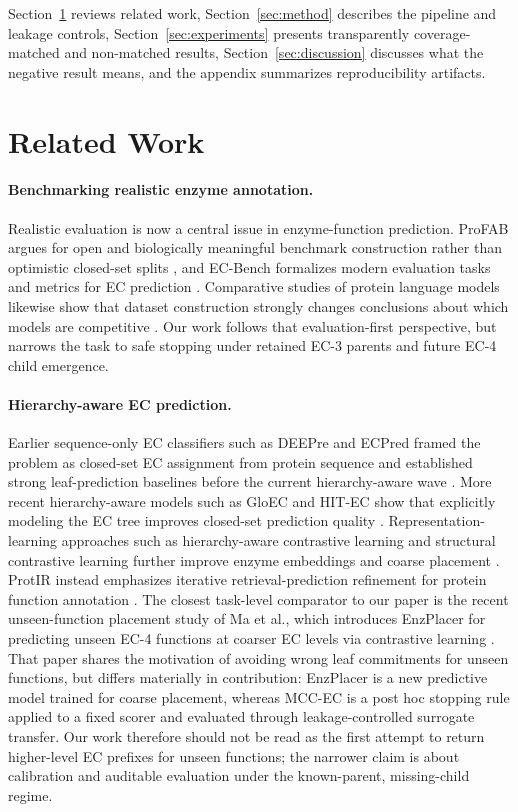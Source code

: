 \documentclass{article}
\newcommand{\method}{MCC-EC\xspace}
\begin{document}
Section~\ref{sec:related} reviews related work, Section~\ref{sec:method} describes the pipeline and leakage controls, Section~\ref{sec:experiments} presents transparently coverage-matched and non-matched results, Section~\ref{sec:discussion} discusses what the negative result means, and the appendix summarizes reproducibility artifacts.

\section{Related Work}
\label{sec:related}

\paragraph{Benchmarking realistic enzyme annotation.}
Realistic evaluation is now a central issue in enzyme-function prediction. ProFAB argues for open and biologically meaningful benchmark construction rather than optimistic closed-set splits \citep{Ozdilek_2023}, and EC-Bench formalizes modern evaluation tasks and metrics for EC prediction \citep{Davoudi_2026}. Comparative studies of protein language models likewise show that dataset construction strongly changes conclusions about which models are competitive \citep{Capela_2025}. Our work follows that evaluation-first perspective, but narrows the task to safe stopping under retained EC-3 parents and future EC-4 child emergence.

\paragraph{Hierarchy-aware EC prediction.}
Earlier sequence-only EC classifiers such as DEEPre and ECPred framed the problem as closed-set EC assignment from protein sequence and established strong leaf-prediction baselines before the current hierarchy-aware wave \citep{Li_2018_DEEPre,Dalkiran_2018_ECPred}. More recent hierarchy-aware models such as GloEC and HIT-EC show that explicitly modeling the EC tree improves closed-set prediction quality \citep{Huang_2024,Dumontet_2026}. Representation-learning approaches such as hierarchy-aware contrastive learning and structural contrastive learning further improve enzyme embeddings and coarse placement \citep{Yim_2024,Yang_2024}. ProtIR instead emphasizes iterative retrieval-prediction refinement for protein function annotation \citep{zhang2024protir}. The closest task-level comparator to our paper is the recent unseen-function placement study of Ma et al., which introduces EnzPlacer for predicting unseen EC-4 functions at coarser EC levels via contrastive learning \citep{Ma_2026_how_not_to_be_seen}. That paper shares the motivation of avoiding wrong leaf commitments for unseen functions, but differs materially in contribution: EnzPlacer is a new predictive model trained for coarse placement, whereas \method is a post hoc stopping rule applied to a fixed scorer and evaluated through leakage-controlled surrogate transfer. Our work therefore should not be read as the first attempt to return higher-level EC prefixes for unseen functions; the narrower claim is about calibration and auditable evaluation under the known-parent, missing-child regime.
\end{document}
